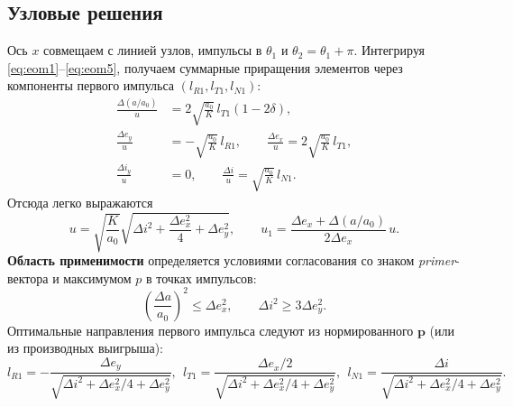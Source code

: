 \documentclass[12pt,a4paper]{article}
\newcommand{\vv}[1]{\bm{#1}}
\begin{document}
\subsection{Узловые решения}
Ось $x$ совмещаем с линией узлов, импульсы в $\theta_1$ и $\theta_2=\theta_1+\pi$.
Интегрируя \eqref{eq:eom1}--\eqref{eq:eom5}, получаем суммарные приращения элементов через компоненты первого импульса $(l_{R1},l_{T1},l_{N1})$:
\begin{align}
\frac{\Delta (a/a_0)}{u} &= 2\sqrt{\frac{a_0}{K}}\, l_{T1}(1-2\delta),\\
\frac{\Delta e_y}{u} &= -\sqrt{\frac{a_0}{K}}\, l_{R1},\qquad
\frac{\Delta e_x}{u} = 2\sqrt{\frac{a_0}{K}}\, l_{T1},\\
\frac{\Delta i_y}{u} &= 0,\qquad
\frac{\Delta i}{u} = \sqrt{\frac{a_0}{K}}\, l_{N1}.
\end{align}
Отсюда легко выражаются
\begin{equation}
u=\sqrt{\frac{K}{a_0}}\sqrt{\Delta i^2 + \frac{\Delta e_x^2}{4} + \Delta e_y^2},\qquad
u_1=\frac{\Delta e_x+\Delta (a/a_0)}{2\Delta e_x}\,u.
\end{equation}
\textbf{Область применимости} определяется условиями согласования со знаком \emph{primer}-вектора и максимумом $p$ в точках импульсов:
\begin{equation}
\left(\frac{\Delta a}{a_0}\right)^2 \le \Delta e_x^2,\qquad
\Delta i^2\ge 3\Delta e_y^2.
\end{equation}
Оптимальные направления первого импульса следуют из нормированного $\vv p$ (или из производных выигрыша):
\begin{equation}
l_{R1}=-\frac{\Delta e_y}{\sqrt{\Delta i^2+\Delta e_x^2/4+\Delta e_y^2}},\ \ 
l_{T1}= \frac{\Delta e_x/2}{\sqrt{\Delta i^2+\Delta e_x^2/4+\Delta e_y^2}},\ \ 
l_{N1}= \frac{\Delta i}{\sqrt{\Delta i^2+\Delta e_x^2/4+\Delta e_y^2}}.
\end{equation}
\end{document}

